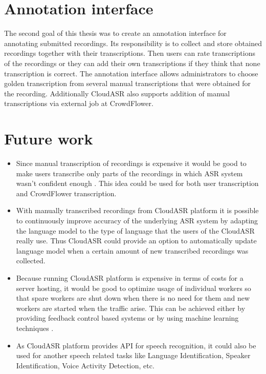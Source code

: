 \section*{Annotation interface}
The second goal of this thesis was to create an annotation interface for annotating submitted recordings.
Its responsibility is to collect and store obtained recordings together with their transcriptions.
Then users can rate transcriptions of the recordings
  or they can add their own transcriptions
  if they think that none transcription is correct.
The annotation interface allows administrators to choose golden transcription from several manual transcriptions
  that were obtained for the recording.
Additionally CloudASR also supports addition of manual transcriptions via external job at CrowdFlower.

\section*{Future work}
\begin{itemize}
  \item
    Since manual transcription of recordings is expensive
      it would be good to make users transcribe only parts of the recordings
      in which ASR system wasn't confident enough \cite{sperber2014fly}.
    This idea could be used for both user transcription and CrowdFlower transcription.

  \item
    With manually transcribed recordings from CloudASR platform
      it is possible to continuously improve accuracy of the underlying ASR system
      by adapting the language model to the type of language that the users of the CloudASR really use.
    Thus CloudASR could provide an option to automatically update language model
      when a certain amount of new transcribed recordings was collected.

  \item
    Because running CloudASR platform is expensive in terms of costs for a server hosting,
      it would be good to optimize usage of individual workers
      so that spare workers are shut down when there is no need for them
      and new workers are started when the traffic arise.
    This can be achieved either by providing feedback control based systems \cite{janert2013feedback}
      or by using machine learning techniques \cite{gong2010press}.

  \item
    As CloudASR platform provides API for speech recognition,
      it could also be used for another speech related tasks like Language Identification, Speaker Identification, Voice Activity Detection, etc.

\end{itemize}


